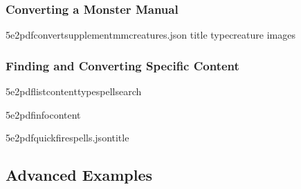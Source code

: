 \documentclass[letterpaper,10pt,english]{sphinxmanual}
\begin{document}
\subsubsection{Converting a Monster Manual}
\label{\detokenize{user-guide/examples:converting-a-monster-manual}}
\begin{sphinxVerbatim}[commandchars=\\\{\}]
5e2pdfconvertsupplementmm\PYGZhy{}creatures.json
\PYGZhy{}\PYGZhy{}title
\PYGZhy{}\PYGZhy{}typecreature
\PYGZhy{}\PYGZhy{}images
\end{sphinxVerbatim}


\subsubsection{Finding and Converting Specific Content}
\label{\detokenize{user-guide/examples:finding-and-converting-specific-content}}
\begin{sphinxVerbatim}[commandchars=\\\{\}]
5e2pdflistcontent\PYGZhy{}\PYGZhy{}typespell\PYGZhy{}\PYGZhy{}search

5e2pdfinfocontent

5e2pdfquickfire\PYGZhy{}spells.json\PYGZhy{}\PYGZhy{}title
\end{sphinxVerbatim}


\subsection{Advanced Examples}
\label{\detokenize{user-guide/examples:advanced-examples}}
\end{document}
